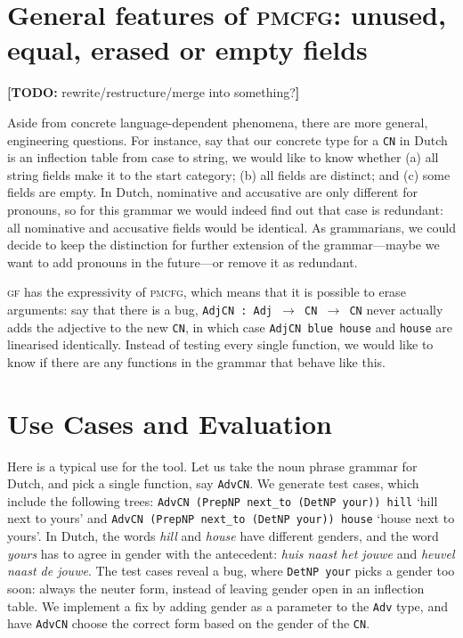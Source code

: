 \documentclass[11pt]{article}
\def\t#1{\texttt{#1}}
\def\gf{\textsc{gf}}
\def\pmcfg{\textsc{pmcfg}}
\newcommand{\todo}[1]{{\color{cyan}\textbf{[TODO: }#1\textbf{]}}}
\begin{document}
\section{General features of \pmcfg: unused, equal,
  erased or empty fields}

\todo{rewrite/restructure/merge into something?}

Aside from concrete language-dependent phenomena, there are more
general, engineering questions. For instance, say that our
concrete type for a \t{CN} in Dutch is an inflection table from case
to string, we would like to know whether (a) all string fields make it to
the start category; (b) all fields are distinct; and (c) some fields
are empty. In Dutch, nominative and accusative are only different for
pronouns, so for this grammar we would indeed find out that case is
redundant: all nominative and accusative fields would be
identical. As grammarians, we could decide to keep the distinction for
further extension of the grammar---maybe we want to add pronouns in
the future---or remove it as redundant.

\gf{} has the expressivity of \pmcfg{}, which means that it is
possible to erase arguments: say that there is a bug, \t{AdjCN : Adj
  $\rightarrow$ CN  $\rightarrow$ CN} never actually adds the
adjective to the new \t{CN}, in which case \t{AdjCN blue house} and
\t{house} are linearised identically. Instead of testing every single
function, we would like to know if there are any functions in the
grammar that behave like this.

\section{Use Cases and Evaluation}

Here is a typical use for the tool. 
Let us take the noun phrase grammar for Dutch, and pick a single function,
say \t{AdvCN}. We generate test cases, which include the following
trees: \t{AdvCN (PrepNP next\_to (DetNP your)) hill} `hill next to
yours' and \t{AdvCN (PrepNP next\_to (DetNP your)) house} `house next
to yours'. In Dutch, the words \emph{hill} and \emph{house} have
different genders, and the word \emph{yours} has to agree in gender
with the antecedent: \emph{huis naast het jouwe} and \emph{heuvel naast de
  jouwe}. The test cases reveal a bug, where \t{DetNP your}
picks a gender too soon: always the neuter form, instead of leaving
gender open in an inflection table. We implement a fix by adding
gender as a parameter to the \t{Adv} type, and have \t{AdvCN} choose
the correct form based on the gender of the \t{CN}. 
\end{document}
